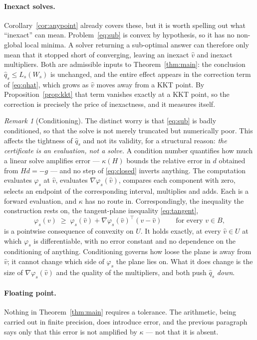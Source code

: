 \documentclass[11pt]{article}
\theoremstyle{plain}
\theoremstyle{remark}
\newtheorem{remark}[lemma]{Remark}
\newcommand{\W}{W}
\newcommand{\vhat}{\hat{v}}
\newcommand{\qhat}{\hat{q}}
\begin{document}
\paragraph{Inexact solves.}
Corollary~\ref{cor:anypoint} already covers these, but it is worth spelling out
what ``inexact'' can mean.  Problem~\eqref{eq:sub} is convex by hypothesis, so
it has no non-global local minima.  A solver returning a sub-optimal answer can
therefore only mean that it stopped short of converging, leaving an inexact
$\vhat$ and inexact multipliers.  Both are admissible inputs to
Theorem~\ref{thm:main}: the conclusion $\qhat_s \le L_s(\W_s)$ is unchanged, and
the entire effect appears in the correction term of \eqref{eq:qhat}, which grows
as $\vhat$ moves away from a KKT point.  By Proposition~\ref{prop:kkt} that term
vanishes exactly at a KKT point, so the correction is precisely the price of
inexactness, and it measures itself.

\begin{remark}[Conditioning]\label{rem:conditioning}
The distinct worry is that \eqref{eq:sub} is badly conditioned, so that the
solve is not merely truncated but numerically poor.  This affects the tightness
of $\qhat_s$ and not its validity, for a structural reason: \emph{the
certificate is an evaluation, not a solve.}  A condition number quantifies how
much a linear solve amplifies error --- $\kappa(H)$ bounds the relative error in
$d$ obtained from $Hd = -g$ --- and no step of \eqref{eq:closed} inverts
anything.  The computation evaluates $\varphi_s$ at $\vhat$, evaluates
$\nabla \varphi_s(\vhat)$, compares each component with zero, selects an
endpoint of the corresponding interval, multiplies and adds.  Each is a forward
evaluation, and $\kappa$ has no route in.  Correspondingly, the inequality the
construction rests on, the tangent-plane inequality \eqref{eq:tangent},
\[
  \varphi_s(v) \;\ge\; \varphi_s(\vhat)
                     + \nabla \varphi_s(\vhat)^{\top} (v - \vhat)
  \qquad \text{for every } v \in B,
\]
is a pointwise consequence of convexity on $U$.  It holds exactly, at every
$\vhat \in U$ at which $\varphi_s$ is differentiable, with no error constant and no dependence on the conditioning of anything.
Conditioning governs how loose the plane is away from $\vhat$; it cannot change
which side of $\varphi_s$ the plane lies on.  What it does change is the size of
$\nabla \varphi_s(\vhat)$ and the quality of the multipliers, and both push
$\qhat_s$ \emph{down}.
\end{remark}

\paragraph{Floating point.}
Nothing in Theorem~\ref{thm:main} requires a tolerance.  The arithmetic, being
carried out in finite precision, does introduce error, and the previous
paragraph says only that this error is not amplified by $\kappa$ --- not that it
is absent.
\end{document}
